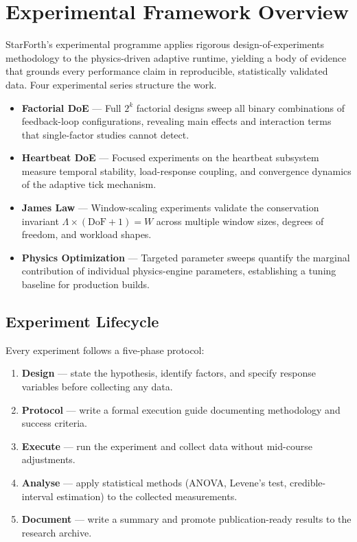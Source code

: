 
\section{Experimental Framework Overview}

StarForth's experimental programme applies rigorous design-of-experiments methodology
to the physics-driven adaptive runtime, yielding a body of evidence that grounds
every performance claim in reproducible, statistically validated data. Four
experimental series structure the work.

\begin{itemize}
  \item \textbf{Factorial DoE} — Full $2^k$ factorial designs sweep all binary
        combinations of feedback-loop configurations, revealing main effects and
        interaction terms that single-factor studies cannot detect.
  \item \textbf{Heartbeat DoE} — Focused experiments on the heartbeat subsystem
        measure temporal stability, load-response coupling, and convergence
        dynamics of the adaptive tick mechanism.
  \item \textbf{James Law} — Window-scaling experiments validate the conservation
        invariant $\Lambda \times (\mathrm{DoF}+1) = W$ across multiple window
        sizes, degrees of freedom, and workload shapes.
  \item \textbf{Physics Optimization} — Targeted parameter sweeps quantify the
        marginal contribution of individual physics-engine parameters, establishing
        a tuning baseline for production builds.
\end{itemize}

\subsection{Experiment Lifecycle}

Every experiment follows a five-phase protocol:

\begin{enumerate}
  \item \textbf{Design} — state the hypothesis, identify factors, and specify
        response variables before collecting any data.
  \item \textbf{Protocol} — write a formal execution guide documenting methodology
        and success criteria.
  \item \textbf{Execute} — run the experiment and collect data without mid-course
        adjustments.
  \item \textbf{Analyse} — apply statistical methods (ANOVA, Levene's test,
        credible-interval estimation) to the collected measurements.
  \item \textbf{Document} — write a summary and promote publication-ready results
        to the research archive.
\end{enumerate}

